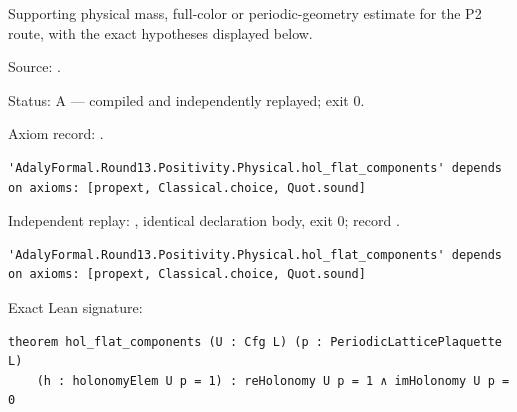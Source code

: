 \begin{theorem}[bp-476]
\label{bp-476}
\uses{}
\leanok
Supporting physical mass, full-color or periodic-geometry estimate for the P2 route, with the exact hypotheses displayed below.

\par Source: \texttt{}.
\par Status: A — compiled and independently replayed; exit 0.
\par Axiom record: \texttt{}.
\begin{verbatim}
'AdalyFormal.Round13.Positivity.Physical.hol_flat_components' depends on axioms: [propext, Classical.choice, Quot.sound]
\end{verbatim}
\par Independent replay: \texttt{}, identical declaration body, exit 0; record \texttt{}.
\begin{verbatim}
'AdalyFormal.Round13.Positivity.Physical.hol_flat_components' depends on axioms: [propext, Classical.choice, Quot.sound]
\end{verbatim}
\par Exact Lean signature:
\begin{verbatim}
theorem hol_flat_components (U : Cfg L) (p : PeriodicLatticePlaquette L)
    (h : holonomyElem U p = 1) : reHolonomy U p = 1 ∧ imHolonomy U p = 0
\end{verbatim}
\end{theorem}

